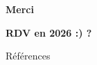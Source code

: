 \documentclass[aspectratio=169,xcolor=dvipsnames]{beamer}
\begin{document}
\begin{frame}
    \Huge{\centerline{\textbf{Merci}}}
    \large{\centerline{\textbf{RDV en 2026 :) ?}}}
\end{frame}



\begin{frame}{Références}
    \footnotesize
    
    
\end{frame}





\end{document}
